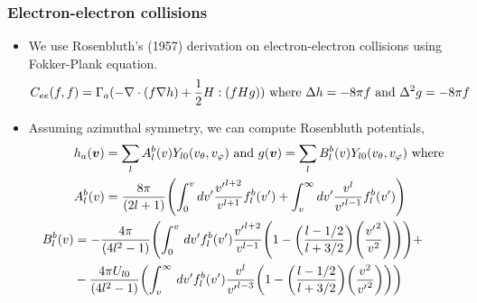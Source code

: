 \documentclass[mathserif, aspectratio=169]{beamer}
\newcommand{\vect}[1]{\boldsymbol{#1}}
\newcommand{\of}[1]{\mleft( #1 \mright)}
\newcommand{\diff}[1]{\, d#1}
\newcommand{\vtheta}{{v_{\theta}}}
\newcommand{\vphi}{v_{\varphi}}
\begin{document}
\begin{frame}
	\frametitle{Electron-electron collisions}
	\begin{itemize}
		\item We use Rosenbluth's (1957) derivation on electron-electron collisions using Fokker-Plank equation.
		\begin{align*}
			C_{ee}(f,f) &= \Gamma_a(-\nabla \cdot (f \nabla h ) + \frac{1}{2} H : \of{f H g}) \text{ where } \Delta h  = -8\pi f \text{ and } \Delta^2 g =-8\pi f	
		\end{align*}
		\item Assuming azimuthal symmetry, we can compute Rosenbluth potentials, 
		\begin{align*}
			& h_a\of{\vect{v}} = \sum_{l} A^{b}_l\of{v} Y_{l0}\of{\vtheta, \vphi}  \text{ and } g\of{\vect{v}} = \sum_{l} B^{b}_l\of{v} Y_{l0}\of{\vtheta, \vphi}\text{ where } \\
			& A^{b}_l\of{v} = \frac{8\pi}{(2l+1)}\of{\int_{0}^{v} dv^\prime \frac{{v^\prime}^{l+2}}{v^{l+1}} f^{b}_l\of{v^\prime} +  \int_{v}^{\infty} dv^\prime \frac{{v}^{l}}{{v^\prime}^{l-1}} f^{b}_l\of{v^\prime}}\\
			B^{b}_{l}\of{v} & = -\frac{4\pi}{(4l^2-1)} \of
			{
				\int_{0}^{v} \diff{v^\prime} f^{b}_l\of{v^\prime} \frac{{v^\prime}^{l+2}}{v^{l-1}} \of{1 - \of{\frac{l-1/2}{l+3/2}}\of{\frac{{v^\prime}^2 }{v^2}}} } + \\
			&-\frac{4\pi U_{l0}}{(4l^2-1)} \of{
				\int_{v}^{\infty} \diff{v^\prime} f^{b}_l\of{v^\prime} \frac{{v}^{l}}{{v^\prime}^{l-3}} \of{1 - \of{\frac{l-1/2}{l+3/2}}\of{\frac{{v}^2 }{{v^\prime}^2}}}
			}
		\end{align*}
	\end{itemize}
\end{frame}
\end{document}
